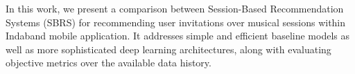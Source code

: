 \documentclass[tcc,numbers]{coppe}
\begin{document}
  \begin{foreignabstract}

  
  In this work, we present a comparison between Session-Based Recommendation
  Systems (SBRS) for recommending user invitations over musical sessions within
  Indaband mobile application. It addresses simple and efficient baseline models
  as well as more sophisticated deep learning architectures, along with
  evaluating objective metrics over the available data history.

  \end{foreignabstract}

  \tableofcontents
  \listoffigures
  \listoftables
  \printlosymbols
  \printloabbreviations
  \mainmatter
  

  

  

  

  

  \backmatter
  
  
  

  \appendix
\end{document}
